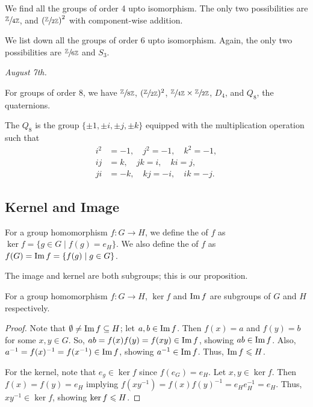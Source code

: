 \begin{example}
    We find all the groups of order 4 upto isomorphism. The only two possibilities are $\sfrac{\mathbb{Z}}{4\mathbb{Z}}$, and $\left( \sfrac{\mathbb{Z}}{2\mathbb{Z}} \right)^{2}$ with component-wise addition.
\end{example}

\begin{example}
    We list down all the groups of order 6 upto isomorphism. Again, the only two possibilities are $\sfrac{\mathbb{Z}}{6\mathbb{Z}}$ and $S_{3}$.
\end{example}

\textit{August 7th.}

\begin{example}
    For groups of order 8, we have $\sfrac{\mathbb{Z}}{8\mathbb{Z}}$, $(\sfrac{\mathbb{Z}}{2\mathbb{Z}})^{2}$, $\sfrac{\mathbb{Z}}{4\mathbb{Z}} \times \sfrac{\mathbb{Z}}{2\mathbb{Z}}$, $D_{4}$, and $Q_{8}$, the quaternions.
\end{example}

The  $Q_{8}$ is the group $\{\pm 1, \pm i, \pm j, \pm k\}$ equipped with the multiplication operation such that
\begin{align}
    i^{2} &= -1, \quad j^{2} = -1, \quad k^{2} = -1, \\
    ij &= k, \quad jk = i, \quad ki = j, \\
    ji &= -k, \quad kj = -i, \quad ik = -j.
\end{align}

\subsection{Kernel and Image}

\begin{definition}
    For a group homomorphism $f:G \to H$, we define the  of $f$ as $\ker f = \{g \in G \mid f(g) = e_{H}\}$. We also define the  of $f$ as $f(G) = \operatorname{Im} f = \{f(g) \mid g \in G\}$.
\end{definition}

The image and kernel are both subgroups; this is our proposition.

\begin{proposition}
    For a group homomorphism $f:G \to H$, $\ker f$ and $\operatorname{Im} f$ are subgroups of $G$ and $H$ respectively.
\end{proposition}

\begin{proof}
    Note that $\emptyset \neq \operatorname{Im} f \subseteq H$; let $a,b \in \operatorname{Im} f$. Then $f(x) = a$ and $f(y) = b$ for some $x,y \in G$. So, $ab = f(x) f(y) = f(xy) \in \operatorname{Im} f$, showing $ab \in \operatorname{Im} f$. Also, $a^{-1} = f(x)^{-1} = f(x^{-1}) \in \operatorname{Im} f$, showing $a^{-1} \in \operatorname{Im} f$. Thus, $\operatorname{Im} f \leqslant H$.

    For the kernel, note that $e_{g} \in \ker f$ since $f(e_{G}) = e_{H}$. Let $x,y \in \ker f$. Then $f(x) = f(y) = e_{H}$ implying $f(xy^{-1}) = f(x)f(y)^{-1} = e_{H}e_{H}^{-1} = e_{H}$. Thus, $xy^{-1} \in \ker f$, showing $\ker f \leqslant H$.
\end{proof}


